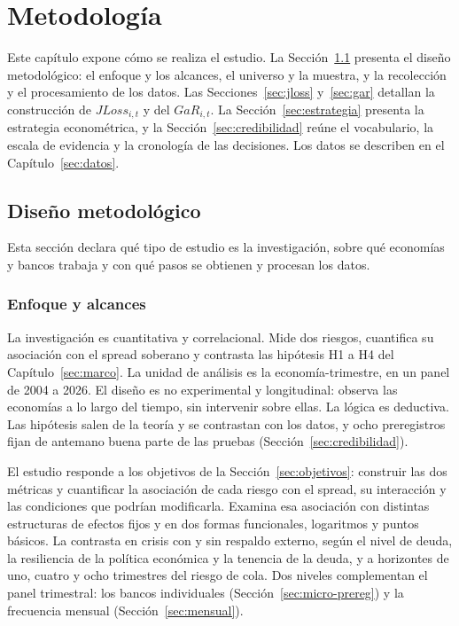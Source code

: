 \chapter{Metodología}
\label{sec:metodologia}

Este capítulo expone cómo se realiza el estudio. La Sección~\ref{sec:diseno} presenta el diseño metodológico: el enfoque y los alcances, el universo y la muestra, y la recolección y el procesamiento de los datos. Las Secciones~\ref{sec:jloss} y~\ref{sec:gar} detallan la construcción de $JLoss_{i,t}$ y del $GaR_{i,t}$. La Sección~\ref{sec:estrategia} presenta la estrategia econométrica, y la Sección~\ref{sec:credibilidad} reúne el vocabulario, la escala de evidencia y la cronología de las decisiones. Los datos se describen en el Capítulo~\ref{sec:datos}.

\section{Diseño metodológico}
\label{sec:diseno}

Esta sección declara qué tipo de estudio es la investigación, sobre qué economías y bancos trabaja y con qué pasos se obtienen y procesan los datos.

\subsection{Enfoque y alcances}
\label{sec:enfoque}

La investigación es cuantitativa y correlacional. Mide dos riesgos, cuantifica su asociación con el spread soberano y contrasta las hipótesis H1 a H4 del Capítulo~\ref{sec:marco}. La unidad de análisis es la economía-trimestre, en un panel de 2004 a 2026. El diseño es no experimental y longitudinal: observa las economías a lo largo del tiempo, sin intervenir sobre ellas. La lógica es deductiva. Las hipótesis salen de la teoría y se contrastan con los datos, y ocho preregistros fijan de antemano buena parte de las pruebas (Sección~\ref{sec:credibilidad}).

El estudio responde a los objetivos de la Sección~\ref{sec:objetivos}: construir las dos métricas y cuantificar la asociación de cada riesgo con el spread, su interacción y las condiciones que podrían modificarla. Examina esa asociación con distintas estructuras de efectos fijos y en dos formas funcionales, logaritmos y puntos básicos. La contrasta en crisis con y sin respaldo externo, según el nivel de deuda, la resiliencia de la política económica y la tenencia de la deuda, y a horizontes de uno, cuatro y ocho trimestres del riesgo de cola. Dos niveles complementan el panel trimestral: los bancos individuales (Sección~\ref{sec:micro-prereg}) y la frecuencia mensual (Sección~\ref{sec:mensual}).

